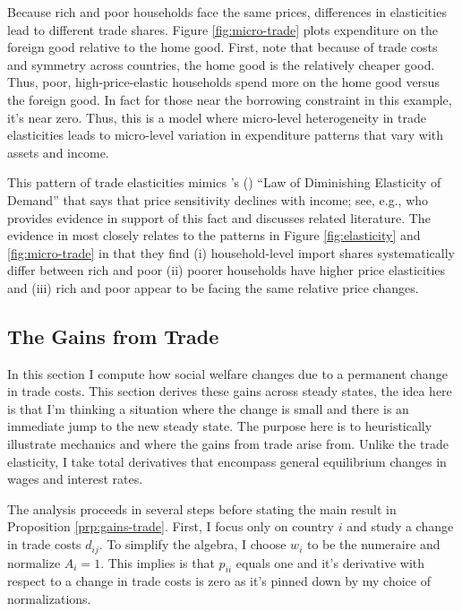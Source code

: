 \documentclass[12pt,pdftex]{article}
\def\citeapos#1{\citeauthor{#1}'s (\citeyear{#1})}
\begin{document}
\begin{onehalfspacing}
Because rich and poor households face the same prices, differences in elasticities lead to different trade shares. Figure \ref{fig:micro-trade} plots expenditure on the foreign good relative to the home good. First, note that because of trade costs and symmetry across countries, the home good is the relatively cheaper good. Thus, poor, high-price-elastic households spend more on the home good versus the foreign good. In fact for those near the borrowing constraint in this example, it's near zero. Thus, this is a model where micro-level heterogeneity in trade elasticities leads to micro-level variation in expenditure patterns that vary with assets and income.

This pattern of trade elasticities mimics \citeapos{harrod1936trade} ``Law of Diminishing Elasticity of Demand'' that says that price sensitivity declines with income; see, e.g., \citet{sangani2022markups} who provides evidence in support of this fact and discusses related literature. The evidence in \citet*{auer2022unequal} most closely relates to the patterns in Figure \ref{fig:elasticity} and \ref{fig:micro-trade} in that they find (i) household-level import shares systematically differ between rich and poor (ii) poorer households have higher price elasticities and (iii) rich and poor appear to be facing the same relative price changes.

\subsection{The Gains from Trade}

In this section I compute how social welfare changes due to a permanent change in trade costs. This section derives these gains across steady states, the idea here is that I'm thinking a situation where the change is small and there is an immediate jump to the new steady state. The purpose here is to heuristically illustrate mechanics and where the gains from trade arise from. Unlike the trade elasticity, I take total derivatives that encompass general equilibrium changes in wages and interest rates.

The analysis proceeds in several steps before stating the main result in Proposition \ref{prp:gains-trade}. First, I focus only on country $i$ and study a change in trade costs $d_{ij}$. To simplify the algebra, I choose $w_i$ to be the numeraire and normalize $A_i = 1$. This implies is that $p_{ii}$ equals one and it's derivative with respect to a change in trade costs is zero as it's pinned down by my choice of normalizations.


\end{onehalfspacing}
\end{document}
